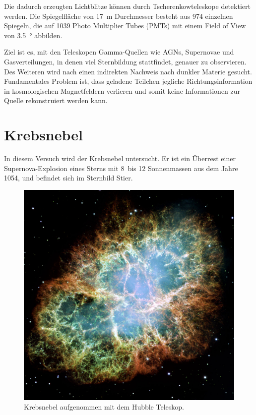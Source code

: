 Die dadurch erzeugten Lichtblitze können durch Tscherenkowteleskope detektiert
werden.
Die Spiegelfläche von \SI{17}{\meter} Durchmesser besteht aus \num{974} einzelnen
Spiegeln, die auf \num{1039} Photo Multiplier Tubes (PMTs) mit einem
Field of View von \SI{3.5}{\degree} abbilden.

Ziel ist es, mit den Teleskopen Gamma-Quellen wie AGNs, Supernovae und
Gasverteilungen, in denen viel Sternbildung stattfindet, genauer zu observieren.
Des Weiteren wird nach einen indirekten Nachweis nach dunkler Materie gesucht.
Fundamentales Problem ist, dass geladene Teilchen jegliche Richtungsinformation
in kosmologischen Magnetfeldern verlieren und somit keine Informationen zur
Quelle rekonstruiert werden kann.

\section*{Krebsnebel}%
\label{sec:krebsnebel}

In diesem Versuch wird der Krebsnebel untersucht.
Er ist ein Überrest einer Supernova-Explosion eines Sterns
mit 8~bis 12 Sonnenmassen aus dem Jahre 1054,
und befindet sich im Sternbild Stier.

\begin{figure}
		\includegraphics[width=\linewidth]{pictures/crab.jpg}
		\caption{Krebsnebel aufgenommen mit dem Hubble Teleskop.}%
		\label{fig:magic}
\end{figure}

